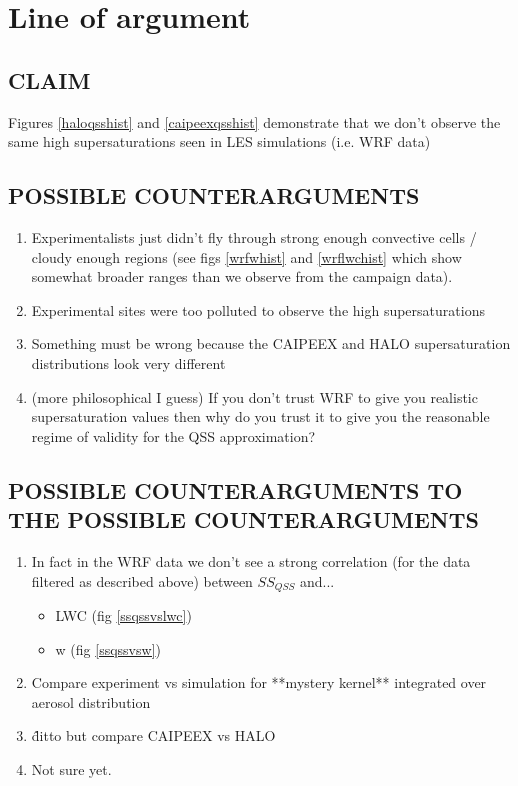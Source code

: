 \documentclass{article}
\begin{document}
\section{Line of argument}
\subsection{CLAIM}
Figures \ref{haloqsshist} and \ref{caipeexqsshist} demonstrate that we don't observe the same high supersaturations seen in LES simulations (i.e. WRF data) 
\subsection{POSSIBLE COUNTERARGUMENTS}
\begin{enumerate}
	\item Experimentalists just didn't fly through strong enough convective cells / cloudy enough regions (see figs \ref{wrfwhist} and \ref{wrflwchist} which show somewhat broader ranges than we observe from the campaign data).
	\item Experimental sites were too polluted to observe the high supersaturations
	\item Something must be wrong because the CAIPEEX and HALO supersaturation distributions look very different
	\item (more philosophical I guess) If you don't trust WRF to give you realistic supersaturation values then why do you trust it to give you the reasonable regime of validity for the QSS approximation?
\end{enumerate}
\subsection{POSSIBLE COUNTERARGUMENTS TO THE POSSIBLE COUNTERARGUMENTS}
\begin{enumerate}
	\item In fact in the WRF data we don't see a strong correlation (for the data filtered as described above) between $SS_{QSS}$ and...
	\begin{itemize}
		\item LWC (fig \ref{ssqssvslwc})
		\item w (fig \ref{ssqssvsw})
	\end{itemize}
	\item Compare experiment vs simulation for **mystery kernel** integrated over aerosol distribution
	\item \^ ditto but compare CAIPEEX vs HALO
	\item Not sure yet.
\end{enumerate}
\end{document}
